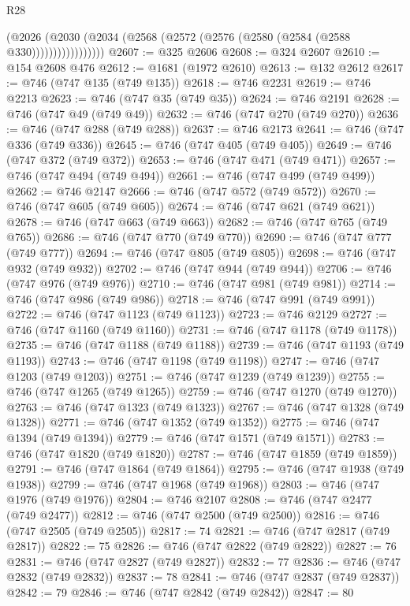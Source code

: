 \begin{lexlean}{R28}
\begin{coremodule}
                    (@2026
                      (@2030 (@2034 (@2568 (@2572 (@2576 (@2580 (@2584 (@2588 @330)))))))))))))))))
@2607 := @325 @2606
@2608 := @324 @2607
@2610 := @154 @2608 @476
@2612 := @1681 (@1972 @2610)
@2613 := @132 @2612
@2617 := @746 (@747 @135 (@749 @135))
@2618 := @746 @2231
@2619 := @746 @2213
@2623 := @746 (@747 @35 (@749 @35))
@2624 := @746 @2191
@2628 := @746 (@747 @49 (@749 @49))
@2632 := @746 (@747 @270 (@749 @270))
@2636 := @746 (@747 @288 (@749 @288))
@2637 := @746 @2173
@2641 := @746 (@747 @336 (@749 @336))
@2645 := @746 (@747 @405 (@749 @405))
@2649 := @746 (@747 @372 (@749 @372))
@2653 := @746 (@747 @471 (@749 @471))
@2657 := @746 (@747 @494 (@749 @494))
@2661 := @746 (@747 @499 (@749 @499))
@2662 := @746 @2147
@2666 := @746 (@747 @572 (@749 @572))
@2670 := @746 (@747 @605 (@749 @605))
@2674 := @746 (@747 @621 (@749 @621))
@2678 := @746 (@747 @663 (@749 @663))
@2682 := @746 (@747 @765 (@749 @765))
@2686 := @746 (@747 @770 (@749 @770))
@2690 := @746 (@747 @777 (@749 @777))
@2694 := @746 (@747 @805 (@749 @805))
@2698 := @746 (@747 @932 (@749 @932))
@2702 := @746 (@747 @944 (@749 @944))
@2706 := @746 (@747 @976 (@749 @976))
@2710 := @746 (@747 @981 (@749 @981))
@2714 := @746 (@747 @986 (@749 @986))
@2718 := @746 (@747 @991 (@749 @991))
@2722 := @746 (@747 @1123 (@749 @1123))
@2723 := @746 @2129
@2727 := @746 (@747 @1160 (@749 @1160))
@2731 := @746 (@747 @1178 (@749 @1178))
@2735 := @746 (@747 @1188 (@749 @1188))
@2739 := @746 (@747 @1193 (@749 @1193))
@2743 := @746 (@747 @1198 (@749 @1198))
@2747 := @746 (@747 @1203 (@749 @1203))
@2751 := @746 (@747 @1239 (@749 @1239))
@2755 := @746 (@747 @1265 (@749 @1265))
@2759 := @746 (@747 @1270 (@749 @1270))
@2763 := @746 (@747 @1323 (@749 @1323))
@2767 := @746 (@747 @1328 (@749 @1328))
@2771 := @746 (@747 @1352 (@749 @1352))
@2775 := @746 (@747 @1394 (@749 @1394))
@2779 := @746 (@747 @1571 (@749 @1571))
@2783 := @746 (@747 @1820 (@749 @1820))
@2787 := @746 (@747 @1859 (@749 @1859))
@2791 := @746 (@747 @1864 (@749 @1864))
@2795 := @746 (@747 @1938 (@749 @1938))
@2799 := @746 (@747 @1968 (@749 @1968))
@2803 := @746 (@747 @1976 (@749 @1976))
@2804 := @746 @2107
@2808 := @746 (@747 @2477 (@749 @2477))
@2812 := @746 (@747 @2500 (@749 @2500))
@2816 := @746 (@747 @2505 (@749 @2505))
@2817 := 74
@2821 := @746 (@747 @2817 (@749 @2817))
@2822 := 75
@2826 := @746 (@747 @2822 (@749 @2822))
@2827 := 76
@2831 := @746 (@747 @2827 (@749 @2827))
@2832 := 77
@2836 := @746 (@747 @2832 (@749 @2832))
@2837 := 78
@2841 := @746 (@747 @2837 (@749 @2837))
@2842 := 79
@2846 := @746 (@747 @2842 (@749 @2842))
@2847 := 80

\end{coremodule}
\end{lexlean}
